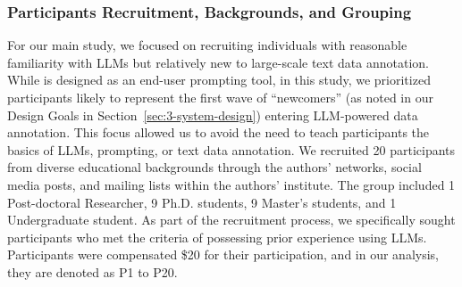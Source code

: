 


\subsubsection{Participants Recruitment, Backgrounds, and Grouping}
For our main study, we focused on recruiting individuals with reasonable familiarity with LLMs but relatively new to large-scale text data annotation. 
While \system is designed as an end-user prompting tool, in this study, we prioritized participants likely to represent the first wave of ``newcomers'' (as noted in our Design Goals in Section~\ref{sec:3-system-design}) entering LLM-powered data annotation. %
This focus allowed us to avoid the need to teach participants the basics of LLMs, prompting, or text data annotation.
We recruited 20 participants from diverse educational backgrounds through the authors' networks, social media posts, and mailing lists within the authors' institute. 
The group included 1 Post-doctoral Researcher, 9 Ph.D. students, 9 Master's students, and 1 Undergraduate student.  
As part of the recruitment process, we specifically sought participants who met the criteria of possessing prior experience using LLMs. 
Participants were compensated \$20 for their participation, and in our analysis, they are denoted as P1 to P20.



